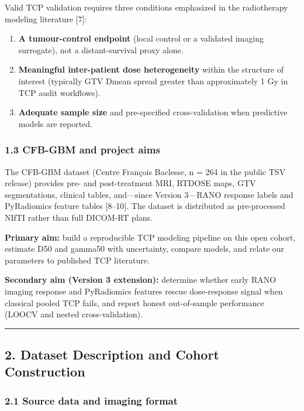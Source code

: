 \documentclass[
  11pt,
]{article}
\providecommand{\tightlist}{%
  \setlength{\itemsep}{0pt}\setlength{\parskip}{0pt}}
\begin{document}
Valid TCP validation requires three conditions emphasized in the
radiotherapy modeling literature {[}7{]}:

\begin{enumerate}
\def\labelenumi{\arabic{enumi}.}
\tightlist
\item
  \textbf{A tumour-control endpoint} (local control or a validated
  imaging surrogate), not a distant-survival proxy alone.
\item
  \textbf{Meaningful inter-patient dose heterogeneity} within the
  structure of interest (typically GTV Dmean spread greater than
  approximately 1 Gy in TCP audit workflows).
\item
  \textbf{Adequate sample size} and pre-specified cross-validation when
  predictive models are reported.
\end{enumerate}

\subsubsection{1.3 CFB-GBM and project
aims}\label{cfb-gbm-and-project-aims}

The CFB-GBM dataset (Centre François Baclesse, n = 264 in the public TSV
release) provides pre- and post-treatment MRI, RTDOSE maps, GTV
segmentations, clinical tables, and---since Version 3---RANO response
labels and PyRadiomics feature tables {[}8--10{]}. The dataset is
distributed as pre-processed NIfTI rather than full DICOM-RT plans.

\textbf{Primary aim:} build a reproducible TCP modeling pipeline on this
open cohort, estimate D50 and gamma50 with uncertainty, compare models,
and relate our parameters to published TCP literature.

\textbf{Secondary aim (Version 3 extension):} determine whether early
RANO imaging response and PyRadiomics features rescue dose-response
signal when classical pooled TCP fails, and report honest out-of-sample
performance (LOOCV and nested cross-validation).

\begin{center}\rule{0.5\linewidth}{0.5pt}\end{center}

\subsection{2. Dataset Description and Cohort
Construction}\label{dataset-description-and-cohort-construction}

\subsubsection{2.1 Source data and imaging
format}\label{source-data-and-imaging-format}
\end{document}
